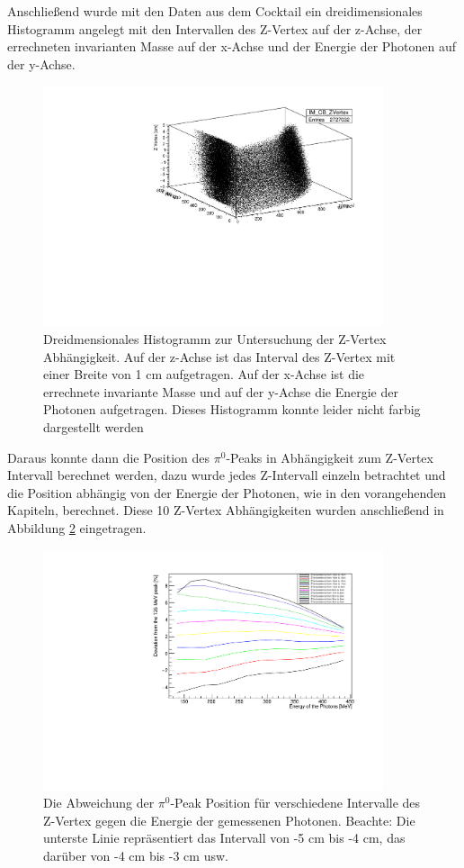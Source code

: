\documentclass[a4paper,11pt,oneside,final,german,openbib,pdftex]{scrbook}
\begin{document}
{ Anschließend wurde mit den Daten aus dem Cocktail ein dreidimensionales Histogramm angelegt mit den Intervallen des Z-Vertex auf der z-Achse, der errechneten invarianten Masse auf der x-Achse und der Energie der Photonen auf der y-Achse. 

\begin{figure}[h!]
	\begin{center}
		\includegraphics[width=100mm]{ZVertex3DHisto}
		\caption{Dreidmensionales Histogramm zur Untersuchung der Z-Vertex Abh\"angigkeit. Auf der z-Achse ist das Interval des Z-Vertex mit einer Breite von 1 cm aufgetragen. Auf der x-Achse ist die errechnete invariante Masse und auf der y-Achse die Energie der Photonen aufgetragen. Dieses Histogramm konnte leider nicht farbig dargestellt werden}
		\label{fig:Z-Vertex-3D-Histogramm}
	\end{center}
\end{figure}

Daraus konnte dann die Position des $\pi^0$-Peaks in Abhängigkeit zum Z-Vertex Intervall berechnet werden, dazu wurde jedes Z-Intervall einzeln betrachtet und die Position abhängig von der Energie der Photonen, wie in den vorangehenden Kapiteln, berechnet.
Diese 10 Z-Vertex Abhängigkeiten wurden anschließend in Abbildung \ref{fig:Z-Vertex-Multi-Graph} eingetragen.

\begin{figure}[h!]
	\begin{center}
		\includegraphics[width=100mm]{FullZVertexDependence}
		\caption{Die Abweichung der $\pi^0$-Peak Position für verschiedene Intervalle des Z-Vertex gegen die Energie der gemessenen Photonen. Beachte: Die unterste Linie repr\"asentiert das Intervall von -5 cm bis -4 cm, das dar\"uber von -4 cm bis -3 cm usw.}
		\label{fig:Z-Vertex-Multi-Graph}
	\end{center}
\end{figure}

}
\end{document}
